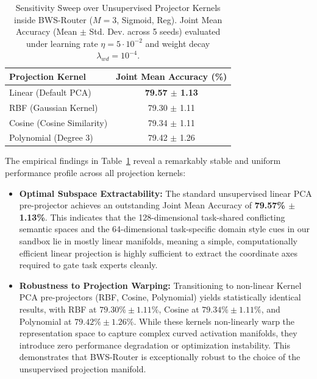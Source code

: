 \begin{table}[h]
\caption{Sensitivity Sweep over Unsupervised Projector Kernels inside BWS-Router ($M=3$, Sigmoid, Reg). Joint Mean Accuracy (Mean $\pm$ Std. Dev. across 5 seeds) evaluated under learning rate $\eta = 5 \cdot 10^{-2}$ and weight decay $\lambda_{wd} = 10^{-4}$.}
\label{tab:nonlinear_projectors}
\vskip 0.15in
\begin{center}
\begin{small}
\begin{tabular}{lc}
\toprule
\textbf{Projection Kernel} & \textbf{Joint Mean Accuracy (\%)} \\
\midrule
Linear (Default PCA) & \textbf{79.57 $\pm$ 1.13} \\
RBF (Gaussian Kernel) & 79.30 $\pm$ 1.11 \\
Cosine (Cosine Similarity) & 79.34 $\pm$ 1.11 \\
Polynomial (Degree 3) & 79.42 $\pm$ 1.26 \\
\bottomrule
\end{tabular}
\end{small}
\end{center}
\vskip -0.1in
\end{table}

The empirical findings in Table~\ref{tab:nonlinear_projectors} reveal a remarkably stable and uniform performance profile across all projection kernels:
\begin{itemize}
    \item \textbf{Optimal Subspace Extractability:} The standard unsupervised linear PCA pre-projector achieves an outstanding Joint Mean Accuracy of \textbf{79.57\% $\pm$ 1.13\%}. This indicates that the 128-dimensional task-shared conflicting semantic spaces and the 64-dimensional task-specific domain style cues in our sandbox lie in mostly linear manifolds, meaning a simple, computationally efficient linear projection is highly sufficient to extract the coordinate axes required to gate task experts cleanly.
    \item \textbf{Robustness to Projection Warping:} Transitioning to non-linear Kernel PCA pre-projectors (RBF, Cosine, Polynomial) yields statistically identical results, with RBF at $79.30\% \pm 1.11\%$, Cosine at $79.34\% \pm 1.11\%$, and Polynomial at $79.42\% \pm 1.26\%$. While these kernels non-linearly warp the representation space to capture complex curved activation manifolds, they introduce zero performance degradation or optimization instability. This demonstrates that BWS-Router is exceptionally robust to the choice of the unsupervised projection manifold.
\end{itemize}

